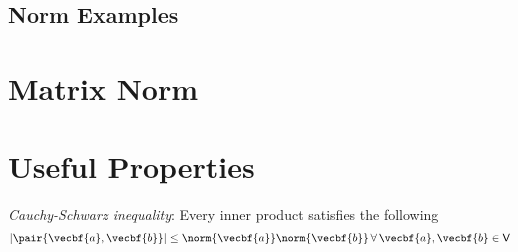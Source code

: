 \documentclass[11pt, reqno]{article}   	%
\newcommand{\V}{\mathsf{V}}
\begin{document}
\subsection{Norm Examples}

\section{Matrix Norm}

\section{Useful Properties}
\begin{definition}
	\emph{Cauchy-Schwarz inequality}: Every inner product satisfies the following
	\[
		\left| \pair{\vecbf{a},\vecbf{b} }\right| \leq \norm{\vecbf{a}} \norm{\vecbf{b}} \, \forall \, \vecbf{a},\vecbf{b} \in \V
	\]
\end{definition}




\end{document}

